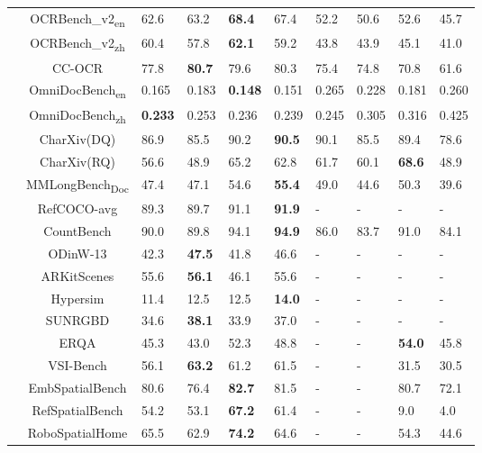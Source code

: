 {\begin{table}[htp]
\begin{adjustbox}{max width=1\textwidth}
\begin{NiceTabular}{c|c|w{c}{1cm}w{c}{1cm}|w{c}{1cm}w{c}{1cm}|w{c}{1cm}w{c}{1cm}|w{c}{1cm}w{c}{1cm}}
&OCRBench\_v2\textsubscript{\scriptsize en} & 62.6 & 63.2 & \textbf{68.4} & 67.4 & 52.2 & 50.6 & 52.6 & 45.7 \\
&OCRBench\_v2\textsubscript{\scriptsize zh} & 60.4 & 57.8 & \textbf{62.1} & 59.2 & 43.8 & 43.9 & 45.1 & 41.0 \\
&CC-OCR & 77.8 & \textbf{80.7} & 79.6 & 80.3 & 75.4 & 74.8 & 70.8 & 61.6 \\
&OmniDocBench\textsubscript{\scriptsize en} & 0.165 & 0.183 & \textbf{0.148} & 0.151 & 0.265 & 0.228 & 0.181 & 0.260 \\
&OmniDocBench\textsubscript{\scriptsize zh} & \textbf{0.233} & 0.253 & 0.236 & 0.239 & 0.245 & 0.305 & 0.316 & 0.425 \\
&CharXiv(DQ) & 86.9 & 85.5 & 90.2 & \textbf{90.5} & 90.1 & 85.5 & 89.4 & 78.6 \\
&CharXiv(RQ) & 56.6 & 48.9 & 65.2 & 62.8 & 61.7 & 60.1 & \textbf{68.6} & 48.9 \\
&MMLongBench\textsubscript{\scriptsize Doc} & 47.4 & 47.1 & 54.6 & \textbf{55.4} & 49.0 & 44.6 & 50.3 & 39.6 \\
\midrule
{}
&RefCOCO-avg & 89.3 & 89.7 & 91.1 & \textbf{91.9} & -    & -    & -    & -    \\  
&CountBench  & 90.0 & 89.8 & 94.1 & \textbf{94.9} & 86.0 & 83.7 & 91.0 & 84.1 \\
&ODinW-13 & 42.3 & \textbf{47.5} & 41.8 & 46.6 & -    & -    & -    & -    \\
&ARKitScenes & 55.6 & \textbf{56.1} & 46.1 & 55.6 & -    & -    & -    & -    \\
&Hypersim & 11.4 & 12.5 & 12.5 & \textbf{14.0} & -    & -    & -    & -    \\
&SUNRGBD & 34.6 & \textbf{38.1} & 33.9 & 37.0 & -    & -    & -    & -    \\
\midrule
{}
&ERQA & 45.3 & 43.0 & 52.3 & 48.8 & -    & - & \textbf{54.0}    & 45.8 \\
&VSI-Bench  & 56.1 & \textbf{63.2} & 61.2 & 61.5 & -    & - & 31.5    & 30.5 \\
&EmbSpatialBench & 80.6 & 76.4 & \textbf{82.7} & 81.5 & -    & - & 80.7    & 72.1 \\
&RefSpatialBench & 54.2 & 53.1 & \textbf{67.2} & 61.4 & -    & -  & 9.0    & 4.0  \\
&RoboSpatialHome & 65.5 & 62.9 & \textbf{74.2} & 64.6 & -    & - & 54.3    & 44.6 \\


\end{NiceTabular}
\end{adjustbox}
\end{table}}

